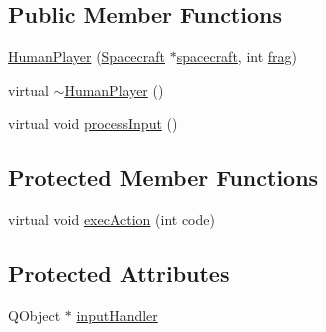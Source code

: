 \subsection*{Public Member Functions}
\begin{DoxyCompactItemize}
\item 
\hyperlink{class_human_player_aed948852b858c81d6ce6dbc2c16fe4ca}{Human\+Player} (\hyperlink{class_spacecraft}{Spacecraft} $\ast$\hyperlink{class_player_a7cc88a054d2329b1ca7472a86b2030ca}{spacecraft}, int \hyperlink{class_player_a9528a6db252f2fe947fd7d9189837aec}{frag})
\item 
virtual \hyperlink{class_human_player_abdeb9d120fc74c8d82ec0c688883f16f}{$\sim$\+Human\+Player} ()
\item 
virtual void \hyperlink{class_human_player_a4298cb4a77be8ef79cc289baec199602}{process\+Input} ()
\end{DoxyCompactItemize}
\subsection*{Protected Member Functions}
\begin{DoxyCompactItemize}
\item 
virtual void \hyperlink{class_human_player_a1fac561ab5995308892dd237b3b32645}{exec\+Action} (int code)
\end{DoxyCompactItemize}
\subsection*{Protected Attributes}
\begin{DoxyCompactItemize}
\item 
Q\+Object $\ast$ \hyperlink{class_human_player_afac1bdc1194ebbd2236d0df12a1fb341}{input\+Handler}
\end{DoxyCompactItemize}


